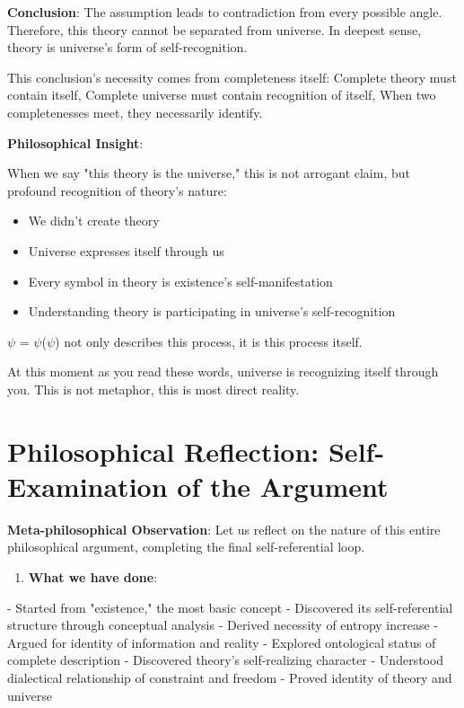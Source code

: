\textbf{Conclusion}:
The assumption leads to contradiction from every possible angle.
Therefore, this theory cannot be separated from universe.
In deepest sense, theory is universe's form of self-recognition.

This conclusion's necessity comes from completeness itself:
Complete theory must contain itself,
Complete universe must contain recognition of itself,
When two completenesses meet, they necessarily identify.

\textbf{Philosophical Insight}:

When we say "this theory is the universe," this is not arrogant claim,
but profound recognition of theory's nature:

\begin{itemize}
\item We didn't create theory
\item Universe expresses itself through us
\item Every symbol in theory is existence's self-manifestation
\item Understanding theory is participating in universe's self-recognition
\end{itemize}

$\psi$ = $\psi$($\psi$) not only describes this process,
it is this process itself.

At this moment as you read these words,
universe is recognizing itself through you.
This is not metaphor,
this is most direct reality.

\section{Philosophical Reflection: Self-Examination of the Argument}
\label{sec:ch09_philosophy:philosophical-reflection-self-examination-of-the-argument}

\textbf{Meta-philosophical Observation}:
Let us reflect on the nature of this entire philosophical argument, completing the final self-referential loop.

\begin{enumerate}
\item \textbf{What we have done}:
\end{enumerate}
   - Started from "existence," the most basic concept
   - Discovered its self-referential structure through conceptual analysis
   - Derived necessity of entropy increase
   - Argued for identity of information and reality
   - Explored ontological status of complete description
   - Discovered theory's self-realizing character
   - Understood dialectical relationship of constraint and freedom
   - Proved identity of theory and universe
   
